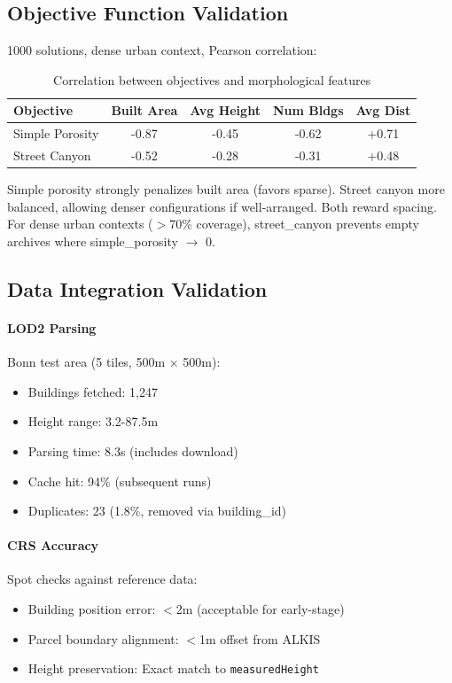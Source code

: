 \documentclass[times,final]{elsarticle}
\begin{document}
\subsection{Objective Function Validation}

1000 solutions, dense urban context, Pearson correlation:

\begin{table}[h]
\centering
\small
\begin{tabular}{lcccc}
\toprule
Objective & Built Area & Avg Height & Num Bldgs & Avg Dist \\
\midrule
Simple Porosity & -0.87 & -0.45 & -0.62 & +0.71 \\
Street Canyon & -0.52 & -0.28 & -0.31 & +0.48 \\
\bottomrule
\end{tabular}
\caption{Correlation between objectives and morphological features}
\end{table}

Simple porosity strongly penalizes built area (favors sparse). Street canyon more balanced, allowing denser configurations if well-arranged. Both reward spacing. For dense urban contexts ($>$70\% coverage), street\_canyon prevents empty archives where simple\_porosity $\rightarrow$ 0.

\subsection{Data Integration Validation}

\paragraph{LOD2 Parsing}
Bonn test area (5 tiles, 500m $\times$ 500m):
\begin{itemize}
\item Buildings fetched: 1,247
\item Height range: 3.2-87.5m
\item Parsing time: 8.3s (includes download)
\item Cache hit: 94\% (subsequent runs)
\item Duplicates: 23 (1.8\%, removed via building\_id)
\end{itemize}

\paragraph{CRS Accuracy}
Spot checks against reference data:
\begin{itemize}
\item Building position error: $<$2m (acceptable for early-stage)
\item Parcel boundary alignment: $<$1m offset from ALKIS
\item Height preservation: Exact match to \texttt{measuredHeight}
\end{itemize}
\end{document}
